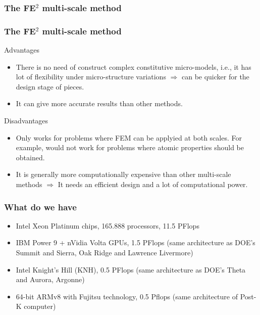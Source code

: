 \documentclass[usenames,dvipsnames]{beamer}
\begin{document}

\begin{frame}
\frametitle{The FE$^2$ multi-scale method}

\begin{figure}[!ht]
\resizebox{1.0\linewidth}{!}{}
\end{figure}
\end{frame}


\begin{frame}
\frametitle{The FE$^2$ multi-scale method}
{\color{ForestGreen}Advantages}
\begin{itemize}
\item There is no need of construct complex constitutive micro-models, i.e., it has lot of flexibility under
micro-structure variations $\Rightarrow$ can be quicker for the design
stage of pieces.
\item It can give more accurate results than other methods.
\end{itemize}

{\color{Red}Disadvantages}
\begin{itemize}
\item Only works for problems where FEM can be applyied at both scales. For example, would not work for problems where atomic
properties should be obtained.
\item It is generally more computationally expensive than other multi-scale methods $\Rightarrow$ It needs an efficient
design and a lot of computational power. 
\end{itemize}
\end{frame}


\begin{frame}
\frametitle{What do we have}

\begin{itemize}

\item Intel Xeon Platinum chips, 165.888 processors, 11.5 PFlops
\vspace{1cm}
\item IBM Power 9 + nVidia Volta GPUs, 1.5 PFlops (same architecture as DOE’s Summit and Sierra, Oak Ridge and Lawrence Livermore)
\item Intel Knight’s Hill (KNH), 0.5 PFlops (same architecture as DOE’s Theta and Aurora, Argonne)
\item 64-bit ARMv8 with Fujitsu technology, 0.5 Pflops (same architecture of Post-K computer)
\end{itemize}

\end{frame}
\end{document}
